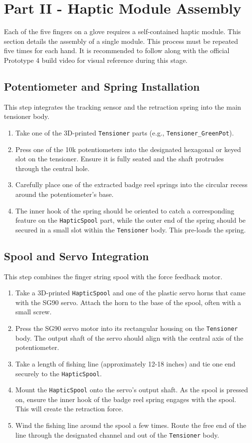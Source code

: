 \documentclass{article}
\begin{document}
\newpage
\section{Part II - Haptic Module Assembly}
Each of the five fingers on a glove requires a self-contained haptic module. This section details the assembly of a single module. This process must be repeated five times for each hand. It is recommended to follow along with the official Prototype 4 build video for visual reference during this stage.

\subsection{Potentiometer and Spring Installation}
This step integrates the tracking sensor and the retraction spring into the main tensioner body.
\begin{enumerate}
    \item Take one of the 3D-printed \texttt{Tensioner} parts (e.g., \texttt{Tensioner\_GreenPot}).
    \item Press one of the 10k potentiometers into the designated hexagonal or keyed slot on the tensioner. Ensure it is fully seated and the shaft protrudes through the central hole.
    \item Carefully place one of the extracted badge reel springs into the circular recess around the potentiometer's base.
    \item The inner hook of the spring should be oriented to catch a corresponding feature on the \texttt{HapticSpool} part, while the outer end of the spring should be secured in a small slot within the \texttt{Tensioner} body. This pre-loads the spring.
\end{enumerate}

\subsection{Spool and Servo Integration}
This step combines the finger string spool with the force feedback motor.
\begin{enumerate}
    \item Take a 3D-printed \texttt{HapticSpool} and one of the plastic servo horns that came with the SG90 servo. Attach the horn to the base of the spool, often with a small screw.
    \item Press the SG90 servo motor into its rectangular housing on the \texttt{Tensioner} body. The output shaft of the servo should align with the central axis of the potentiometer.
    \item Take a length of fishing line (approximately 12-18 inches) and tie one end securely to the \texttt{HapticSpool}.
    \item Mount the \texttt{HapticSpool} onto the servo's output shaft. As the spool is pressed on, ensure the inner hook of the badge reel spring engages with the spool. This will create the retraction force.
    \item Wind the fishing line around the spool a few times. Route the free end of the line through the designated channel and out of the \texttt{Tensioner} body.
\end{enumerate}
\end{document}

